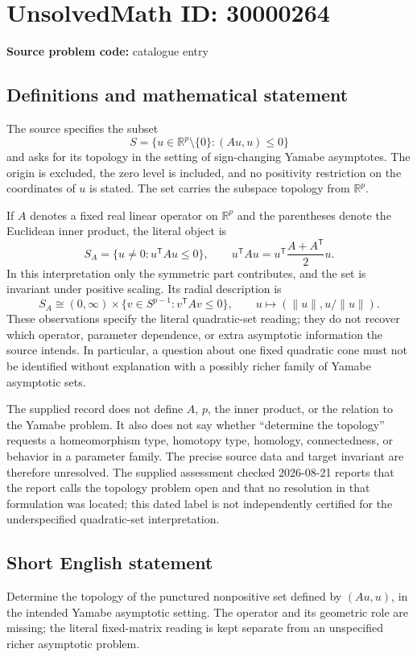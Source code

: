 \documentclass[11pt]{article}
\newcommand{\R}{\mathbb{R}}
\begin{document}
\section*{UnsolvedMath ID: 30000264}
\textbf{Source problem code:} catalogue entry
\subsection{Definitions and mathematical statement}
The source specifies the subset
\[
S=\{u\in\R^p\setminus\{0\}:(Au,u)\leq0\}
\]
and asks for its topology in the setting of sign-changing Yamabe asymptotes. The origin is excluded, the zero level is included, and no positivity restriction on the coordinates of \(u\) is stated. The set carries the subspace topology from \(\R^p\).

If \(A\) denotes a fixed real linear operator on \(\R^p\) and the parentheses denote the Euclidean inner product, the literal object is
\[
S_A=\{u\ne0:u^{\mathsf T}Au\leq0\},
\qquad
u^{\mathsf T}Au=u^{\mathsf T}\frac{A+A^{\mathsf T}}2u.
\]
In this interpretation only the symmetric part contributes, and the set is invariant under positive scaling. Its radial description is
\[
S_A\cong(0,\infty)\times\{v\in S^{p-1}:v^{\mathsf T}Av\leq0\},
\qquad u\longmapsto(\|u\|,u/\|u\|).
\]
These observations specify the literal quadratic-set reading; they do not recover which operator, parameter dependence, or extra asymptotic information the source intends. In particular, a question about one fixed quadratic cone must not be identified without explanation with a possibly richer family of Yamabe asymptotic sets.

The supplied record does not define \(A\), \(p\), the inner product, or the relation to the Yamabe problem. It also does not say whether ``determine the topology'' requests a homeomorphism type, homotopy type, homology, connectedness, or behavior in a parameter family. The precise source data and target invariant are therefore unresolved. The supplied assessment checked 2026-08-21 reports that the report calls the topology problem open and that no resolution in that formulation was located; this dated label is not independently certified for the underspecified quadratic-set interpretation.
\subsection{Short English statement}
Determine the topology of the punctured nonpositive set defined by \((Au,u)\), in the intended Yamabe asymptotic setting. The operator and its geometric role are missing; the literal fixed-matrix reading is kept separate from an unspecified richer asymptotic problem.
\end{document}
